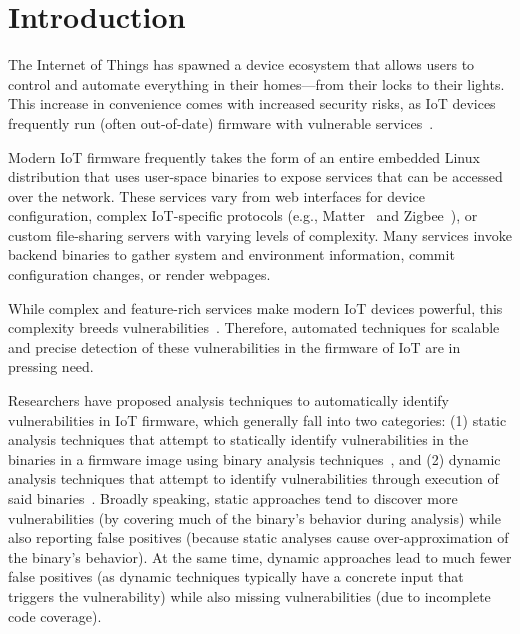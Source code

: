 \section{Introduction}
\label{sec:intro}

The Internet of Things has spawned a device ecosystem that allows users to control and automate everything in their homes---from their locks to their lights.
This increase in convenience comes with increased security risks, as IoT devices frequently run (often out-of-date) firmware with vulnerable services~\cite{kudelski,cybertalk}.

Modern IoT firmware frequently takes the form of an entire embedded Linux distribution that uses user-space binaries to expose services that can be accessed over the network.
These services vary from web interfaces for device configuration, complex IoT-specific protocols (e.g., Matter~\cite{matter} and Zigbee~\cite{zigbee}), or custom file-sharing servers with varying levels of complexity.
Many services invoke backend binaries to gather system and environment information, commit configuration changes, or render webpages.

While complex and feature-rich services make modern IoT devices powerful, this complexity breeds vulnerabilities~\cite{gbhackers,scmagazine}.
Therefore, automated techniques for scalable and precise detection of these vulnerabilities in the firmware of IoT are in pressing need.

Researchers have proposed analysis techniques to automatically identify vulnerabilities in IoT firmware, which generally fall into two categories:
(1) static analysis techniques that attempt to statically identify vulnerabilities in the binaries in a firmware image using binary analysis techniques~\cite{karonte,SaTC},
and (2) dynamic analysis techniques that attempt to identify vulnerabilities through execution of said binaries~\cite{chen2016towards,kim2020firmae,zheng2019firm,zheng2022efficient}.
Broadly speaking, static approaches tend to discover more vulnerabilities (by covering much of the binary's behavior during analysis) while also reporting false positives (because static analyses cause over-approximation of the binary's behavior). 
At the same time, dynamic approaches lead to much fewer false positives (as dynamic techniques typically have a concrete input that triggers the vulnerability) while also missing vulnerabilities (due to incomplete code coverage).

